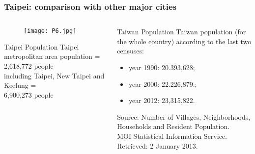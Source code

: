 \documentclass[pdflatex,compress,8pt,
	xcolor={dvipsnames,dvipsnames,svgnames,x11names,table},
	hyperref={	
	breaklinks = true, 
	pdfauthor={Lemenkova Polina}, 
	pdfsubject={Preentation}, 
	pdfcreator={Lemenkova Polina}, 
	pdfproducer={Lemenkova Polina}, 
	colorlinks=true,
	linkcolor=Gold1, 
	citecolor=NavyBlue, 
	urlcolor = NavyBlue, 
	breaklinks = true}]{beamer}
\begin{document}
\begin{frame}\frametitle{Taipei: comparison with other major cities}

\begin{minipage}[0.4\textheight]{\textwidth}
\begin{columns}[T]
\begin{column}{0.5\textwidth}
\begin{figure}[H]
	\centering
		\texttt{[image: P6.jpg]}
\end{figure}

\begin{alertblock}{Taipei Population}
Taipei metropolitan area population = 2,618,772 people\\
 including Taipei, New Taipei and Keelung = \\
 6,900,273 people
\end{alertblock}

\end{column}
\begin{column}{0.5\textwidth}
\vspace{2em}
\begin{block}{Taiwan Population}
Taiwan population (for the whole country) according to the last two censuses: 
\begin{itemize}
	\item year 1990: 20.393,628; 
	\item year 2000: 22.226,879.; 
	\item year 2012: 23,315,822.
\end{itemize}
Source: Number of Villages, Neighborhoods, \\
Households and Resident Population. \\
MOI Statistical Information Service. \\
Retrieved: 2 January 2013.
\end{block}

\end{column}
\end{columns}
\end{minipage}
\end{frame}
\end{document}
